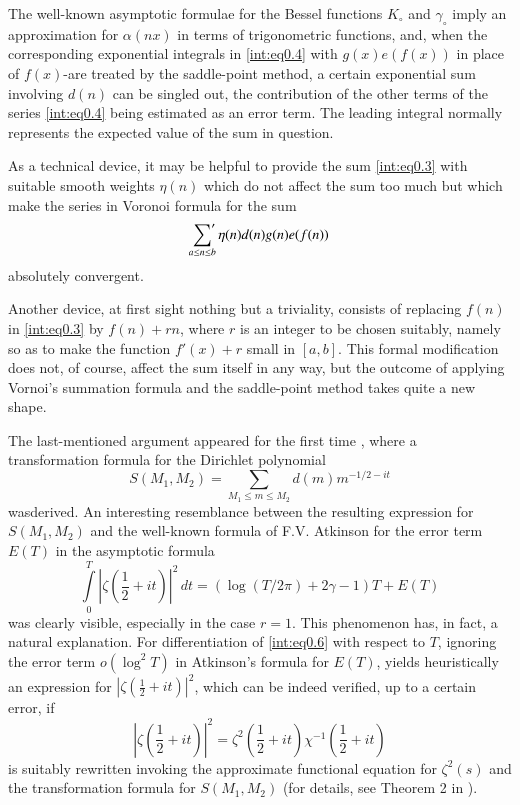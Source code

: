 The well-known asymptotic formulae for the Bessel functions $K_\circ$
and $\gamma_\circ$ imply an approximation for $\alpha(nx)$ in terms of
trigonometric functions, and, when the corresponding exponential
integrals in  \eqref{int:eq0.4} with $g(x)e(f(x))$ in place of
$f(x)$-are treated by the saddle-point method, a certain exponential
sum involving $d(n)$ can be singled out, the contribution of the other
terms of the series \eqref{int:eq0.4} being estimated as an error
term. The leading integral normally represents the expected value of
the sum in question.

As a technical device, it may be helpful to provide the sum
\eqref{int:eq0.3} with suitable smooth weights $\eta(n)$ which do not
affect the sum too much but which make the series in Voronoi formula
for the sum 
$$
\sideset{}{'}\sum\limits_{a\leq n\leq b}\eta(n)d(n)g(n)e(f(n))
$$
absolutely convergent.

Another device, at first sight nothing but a triviality, consists of
replacing $f(n)$ in \eqref{int:eq0.3} by $f(n)+rn$, where $r$ is an
integer to be chosen suitably, namely so as to make the function
$f'(x)+r$ small in $[a,b]$. This formal modification does not, of
course, affect the sum itself in any way, but the outcome of applying
Vornoi's summation formula and the saddle-point method takes quite a
new shape.

The last-mentioned argument appeared for the first time \cite{key16},
where a transformation formula for the Dirichlet polynomial 
\begin{equation}
S(M_1,M_2)=\sum\limits_{M_1\leq m\leq M_2}d(m)
m^{-1/2-it}\tag{0.5}\label{int:eq0.5} 
\end{equation}
was\pageoriginale derived. An interesting resemblance between the
resulting expression for $S(M_1,M_2)$ and the well-known formula of
F.V. Atkinson \cite{key2} for the error term $E(T)$ in the asymptotic
formula 
\begin{equation}
\int\limits_0^T|\zeta\left(\frac{1}{2}+it\right)|^2\,dt
=(\log(T/2\pi)+2\gamma-1)T+E(T) \tag{0.6} \label{int:eq0.6}
\end{equation}
was clearly visible, especially in the case $r=1$. This phenomenon
has, in fact, a natural explanation. For differentiation of
\eqref{int:eq0.6} with respect to $T$, ignoring the error term
$o(\log^2T)$ in Atkinson's formula for $E(T)$, yields heuristically an
expression for $|\zeta(\frac{1}{2}+it)|^2$, which can be indeed
verified, up to a certain error, if 
$$
|\zeta\left(\frac{1}{2}+it\right)|^2=\zeta^2\left(\frac{1}{2}+it\right)\chi^{-1}
(\frac{1}{2}+it)
$$
is suitably rewritten invoking the approximate functional equation for
$\zeta^2(s)$ and the transformation formula for $S(M_1,M_2)$ (for
details, see Theorem 2 in \cite{key16}).

